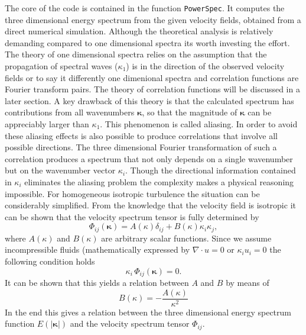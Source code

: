 \documentclass[preprint,12pt,ntfdMod]{elsarticle}
\begin{document}
\begin{par}

The core of the code is contained in the function
\lstinline!PowerSpec!. It computes the three dimensional energy spectrum
from the given velocity fields, obtained from a direct numerical
simulation. Although the theoretical analysis is
relatively demanding compared to one dimensional spectra its worth
investing the effort.
The theory of one dimensional spectra relies
on the assumption that the propagation of spectral waves ($\kappa_1$)
is in the direction of the observed velocity fields or to say it differently one
dimenional spectra and correlation functions are Fourier transform pairs.
The theory of correlation functions will be discussed in a later section.
A key drawback of this theory is that the calculated spectrum has
contributions from all wavenumbers $\boldsymbol\kappa$, so that the
magnitude of $\boldsymbol\kappa$ can be appreciably larger than
$\kappa_1$. This phenomenon is called aliasing.
In order to avoid these aliasing effects is also possible to produce correlations that
involve all possible directions. The three dimensional Fourier
transformation of such a correlation produces a spectrum that not only
depends on a single wavenumber but on the wavenumber vector $\kappa_i$.
Though the directional information contained in $\kappa_i$ eliminates the
aliasing problem the complexity makes a physical reasoning impossible.
For homogeneous isotropic turbulence the situation can be considerably
simplified. From the knowledge that the velocity field is isotropic it can be
shown that the velocity spectrum tensor is fully determined by
  \begin{equation}
      \label{eq:iso_tensor}
      \Phi_{ij}(\boldsymbol\kappa) = A(\kappa)\delta_{ij}+B(\kappa)\kappa_i\kappa_j,
  \end{equation}
where $A(\kappa)$ and $B(\kappa)$ are arbitrary scalar functions. Since we assume
incompressible fluids (mathematically expressed by $\nabla\cdot u=0$ or $\kappa_iu_i=0$
the following condition holds
  \begin{equation}
      \kappa_i\,\Phi_{ij}(\boldsymbol\kappa)=0.
  \end{equation}
It can be shown that this yields a relation between $A$ and $B$ by means of
  \begin{equation}
      \label{eq:rel_AB}
  	B(\kappa)=-\frac{A(\kappa)}{\kappa^2}
  \end{equation}
In the end this gives a relation between the three dimensional energy spectrum
function $E(|\boldsymbol\kappa|)$ and the velocity spectrum tensor $\Phi_{ij}$.

\end{par}
\end{document}
